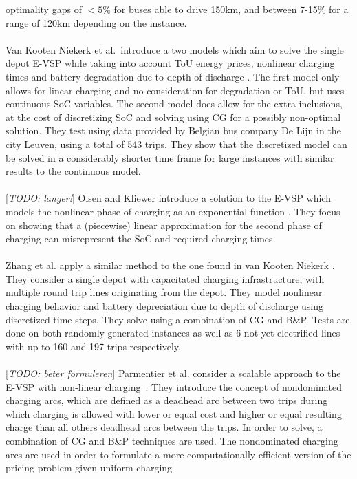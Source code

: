 \documentclass[]{book}
\newcommand{\todo}[1]{{\color{red}[\textit{TODO: #1}]}}
\begin{document}
optimality gaps of $<5\%$ for buses able to drive 150km, and between 7-15\%
for a range of 120km depending on the instance. \\\\
Van Kooten Niekerk et al.\ introduce a two models which aim to solve the single depot E-VSP
while taking into account ToU energy prices, nonlinear charging times and
battery degradation due to depth of discharge \cite{vanKootenNiekerk2017}. The first model only allows for linear charging and no consideration for degradation or ToU, but uses continuous SoC variables. The second model does allow for the extra inclusions, at the cost of discretizing SoC and solving using CG for a possibly non-optimal solution. They test using data provided
by Belgian bus company De Lijn in the city Leuven, using a total of 543 trips. They show that the
discretized model can be solved in a considerably shorter time frame for large instances with similar results to
the continuous model. \\\\
\todo{langer!}
Olsen and Kliewer introduce a solution to the E-VSP which models the nonlinear phase of charging as an exponential function \cite{Olsen2020}. They focus on showing that a (piecewise) linear approximation for the second phase of charging can
misrepresent the SoC and required charging times. \\\\
Zhang et al. apply a similar method to the one found in van Kooten Niekerk
\cite{Zhang2021}. They consider a single depot with capacitated charging infrastructure,
with multiple round trip lines originating from the depot. They model
nonlinear charging behavior and battery depreciation due to depth of discharge using discretized time steps. They solve
using a combination of CG and B\&P. Tests are done on both randomly generated
instances as well as 6 not yet electrified lines with up to 160 and 197 trips
respectively.\\\\
\todo{beter formuleren}
Parmentier et al. consider a scalable approach to the E-VSP with non-linear charging~\cite{Parmentier2023}. They introduce the concept of nondominated charging arcs, which are defined as a deadhead arc between two trips during which charging is allowed with lower or equal cost and higher or equal resulting charge than all others deadhead arcs between the trips. In order to solve, a combination of CG and B\&P techniques are used. The nondominated charging arcs are used in order to formulate a more
computationally efficient version of the pricing problem given uniform charging
\end{document}
